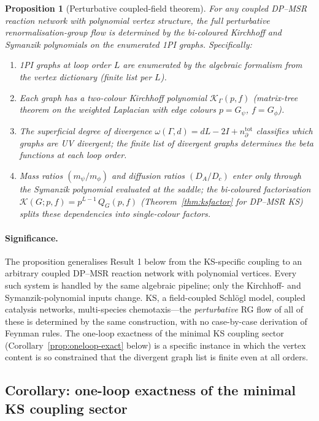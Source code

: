 \documentclass[11pt,a4paper]{article}
\theoremstyle{plain}
\newtheorem{proposition}[theorem]{Proposition}
\begin{document}
\begin{proposition}[Perturbative coupled-field theorem]
\label{prop:perturbative}
For any coupled DP--MSR reaction network with polynomial vertex
structure, the full perturbative renormalisation-group flow is
determined by the bi-coloured Kirchhoff and Symanzik polynomials
on the enumerated 1PI graphs.  Specifically:
\begin{enumerate}[leftmargin=1.8em, itemsep=-0.2em]
\item 1PI graphs at loop order $L$ are enumerated by the algebraic
  formalism from the vertex dictionary (finite list per $L$).
\item Each graph has a two-colour Kirchhoff polynomial
  $\mathcal{K}_\Gamma(p, f)$ (matrix-tree theorem on the
  weighted Laplacian with edge colours $p = G_\psi$,
  $f = G_\phi$).
\item The superficial degree of divergence
  $\omega(\Gamma, d) = dL - 2I + n_\partial^{\mathrm{tot}}$
  classifies which graphs are UV divergent; the finite list of
  divergent graphs determines the beta functions at each loop
  order.
\item Mass ratios $(m_\psi/m_\phi)$ and diffusion ratios
  $(D_A/D_c)$ enter only through the Symanzik polynomial
  evaluated at the saddle; the bi-coloured factorisation
  $\mathcal{K}(G;p,f) = p^{L-1}\,Q_G(p,f)$
  (Theorem~\ref{thm:ksfactor} for DP--MSR KS) splits these
  dependencies into single-colour factors.
\end{enumerate}
\end{proposition}

\paragraph{Significance.}
The proposition generalises Result 1 below from the KS-specific
coupling to an arbitrary coupled DP--MSR reaction network with
polynomial vertices.  Every such system is handled by the same
algebraic pipeline; only the Kirchhoff- and Symanzik-polynomial
inputs change.  KS, a field-coupled Schl\"ogl model, coupled
catalysis networks, multi-species chemotaxis---the
\emph{perturbative} RG flow of all of these is determined by the
same construction, with no case-by-case derivation of Feynman
rules.  The one-loop exactness of the minimal KS coupling sector
(Corollary~\ref{prop:oneloop-exact} below) is a specific instance
in which the vertex content is so constrained that the divergent
graph list is finite even at all orders.

\subsection{Corollary: one-loop exactness of the minimal KS
coupling sector}
\end{document}
